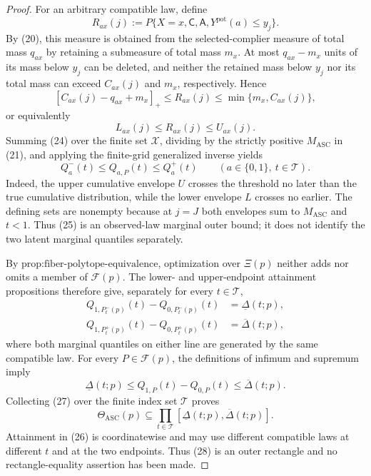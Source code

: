 \documentclass{article}
\begin{document}
\begin{proof}
For an arbitrary compatible law, define
\[
 R_{ax}(j)
 :=P\{X=x,\mathsf C,\mathsf A,
       Y^{\mathrm{pot}}(a)\leq y_j\}.
\tag{22}
\]
By (20), this measure is obtained from the selected-complier measure
of total mass \(q_{ax}\) by retaining a submeasure of total mass
\(m_x\).  At most \(q_{ax}-m_x\) units of its mass below \(y_j\) can
be deleted, and neither the retained mass below \(y_j\) nor its total
mass can exceed \(C_{ax}(j)\) and \(m_x\), respectively.  Hence
\[
 [C_{ax}(j)-q_{ax}+m_x]_+
 \leq R_{ax}(j)
 \leq\min\{m_x,C_{ax}(j)\},
\tag{23}
\]
or equivalently
\[
 L_{ax}(j)\leq R_{ax}(j)\leq U_{ax}(j).
\tag{24}
\]
Summing (24) over the finite set \(\mathcal X\), dividing by the
strictly positive \(M_{\mathrm{ASC}}\) in (21), and applying the
finite-grid generalized inverse yields
\[
 Q_a^-(t)\leq Q_{a,P}(t)\leq Q_a^+(t)
 \qquad(a\in\{0,1\},\ t\in\mathcal T).
\tag{25}
\]
Indeed, the upper cumulative envelope \(U\) crosses the threshold no
later than the true cumulative distribution, while the lower envelope
\(L\) crosses no earlier.  The defining sets are nonempty because at
\(j=J\) both envelopes sum to \(M_{\mathrm{ASC}}\) and \(t<1\).
Thus (25) is an observed-law marginal outer bound; it does not identify
the two latent marginal quantiles separately.

By \(\text{prop:fiber-polytope-equivalence}\), optimization over
\(\Xi(p)\) neither adds nor omits a member of \(\mathcal F(p)\).
The lower- and upper-endpoint attainment propositions therefore give,
separately for every \(t\in\mathcal T\),
\[
 \begin{aligned}
 Q_{1,P_t^-(p)}(t)-Q_{0,P_t^-(p)}(t)
 &=\underline\Delta(t;p),\\
 Q_{1,P_t^+(p)}(t)-Q_{0,P_t^+(p)}(t)
 &=\overline\Delta(t;p),
 \end{aligned}
\tag{26}
\]
where both marginal quantiles on either line are generated by the same
compatible law.  For every \(P\in\mathcal F(p)\), the definitions of
infimum and supremum imply
\[
 \underline\Delta(t;p)
 \leq Q_{1,P}(t)-Q_{0,P}(t)
 \leq\overline\Delta(t;p).
\tag{27}
\]
Collecting (27) over the finite index set \(\mathcal T\) proves
\[
 \Theta_{\mathrm{ASC}}(p)
 \subseteq
 \prod_{t\in\mathcal T}
 [\underline\Delta(t;p),\overline\Delta(t;p)].
\tag{28}
\]
Attainment in (26) is coordinatewise and may use different compatible
laws at different \(t\) and at the two endpoints.  Thus (28) is an
outer rectangle and no rectangle-equality assertion has been made.


\end{proof}
\end{document}
